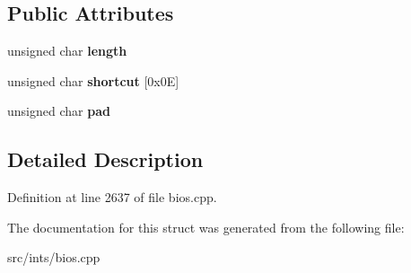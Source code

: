\subsection*{Public Attributes}
\begin{DoxyCompactItemize}
\item 
\hypertarget{structpc98__func__key__shortcut__def_abaceed1a1548b1e78e9f5efce59e52db}{unsigned char {\bfseries length}}\label{structpc98__func__key__shortcut__def_abaceed1a1548b1e78e9f5efce59e52db}

\item 
\hypertarget{structpc98__func__key__shortcut__def_a073430a78271a50b611f35bd105253ab}{unsigned char {\bfseries shortcut} \mbox{[}0x0\-E\mbox{]}}\label{structpc98__func__key__shortcut__def_a073430a78271a50b611f35bd105253ab}

\item 
\hypertarget{structpc98__func__key__shortcut__def_a990a1f47feb6015883e885481702bd07}{unsigned char {\bfseries pad}}\label{structpc98__func__key__shortcut__def_a990a1f47feb6015883e885481702bd07}

\end{DoxyCompactItemize}


\subsection{Detailed Description}


Definition at line 2637 of file bios.\-cpp.



The documentation for this struct was generated from the following file\-:\begin{DoxyCompactItemize}
\item 
src/ints/bios.\-cpp\end{DoxyCompactItemize}
